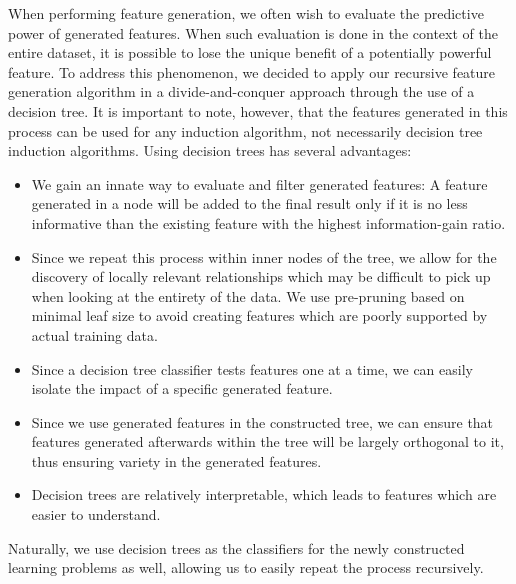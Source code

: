 \documentclass[twoside,11pt]{article}
\theoremstyle{definition}
\begin{document}
When performing feature generation, we often wish to evaluate the predictive power of generated features. When such evaluation is done in the context of the entire dataset, it is possible to lose the unique benefit of a potentially powerful feature. To address this phenomenon, we decided to apply our recursive feature generation algorithm in a divide-and-conquer approach through the use of a decision tree. It is important to note, however, that the features generated in this process can be used for any induction algorithm, not necessarily decision tree induction algorithms.
Using decision trees has several advantages:
\begin{itemize}
	\item We gain an innate way to evaluate and filter generated features: A feature generated in a node will be added to the final result only if it is no less informative than the existing feature with the highest information-gain ratio. %
	\item Since we repeat this process within inner nodes of the tree, we allow for the discovery of locally relevant relationships which may be difficult to pick up when looking at the entirety of the data. We use pre-pruning based on minimal leaf size to avoid creating features which are poorly supported by actual training data.
	\item Since a decision tree classifier tests features one at a time, we can easily isolate the impact of a specific generated feature.
	\item Since we use generated features in the constructed tree, we can ensure that features generated afterwards within the tree will be largely orthogonal to it, thus ensuring variety in the generated features. %
	\item Decision trees are relatively interpretable, which leads to features which are easier to understand.
\end{itemize}
Naturally, we use decision trees as the classifiers for the newly constructed learning problems as well, allowing us to easily repeat the process recursively. %
\end{document}

